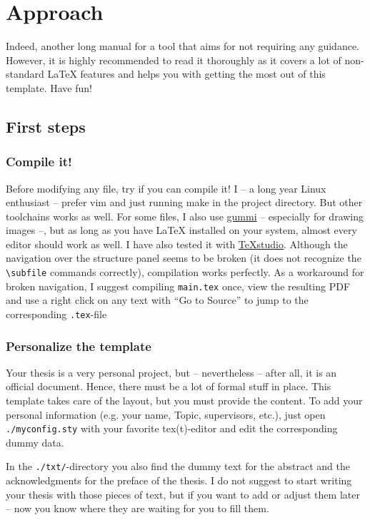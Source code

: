 \documentclass[../main.tex]{subfiles}
\begin{document}
\chapter{Approach}

Indeed, another long manual for a tool \cite{Bithappens16Template} that aims for not requiring any guidance.
However, it is highly recommended to read it thoroughly as it covers a lot of non-standard LaTeX features and helps you with getting the most out of this template.
Have fun!

\section{First steps}

\subsection{Compile it!}

Before modifying any file, try if you can compile it!
I -- a long year Linux enthusiast -- prefer vim and just running make in the project directory.
But other toolchains works as well.
For some files, I also use \href{https://github.com/alexandervdm/gummi}{gummi} -- especially for drawing images --, but as long as you have LaTeX installed on your system, almost every editor should work as well.
I have also tested it with \href{http://www.texstudio.org/}{TeXstudio}.
Although the navigation over the structure panel seems to be broken (it does not recognize the \texttt{\textbackslash subfile} commands correctly), compilation works perfectly.
As a workaround for broken navigation, I suggest compiling \texttt{main.tex} once, view the resulting PDF and use a right click on any text with \enquote{Go to Source} to jump to the corresponding \texttt{.tex}-file


\subsection{Personalize the template}

Your thesis is a very personal project, but -- nevertheless -- after all, it is an official document.
Hence, there must be a lot of formal stuff in place.
This template takes care of the layout, but you must provide the content.
To add your personal information (e.g. your name, Topic, supervisors, etc.), just open \texttt{./myconfig.sty} with your favorite tex(t)-editor and edit the corresponding dummy data.

In the \texttt{./txt/}-directory you also find the dummy text for the abstract and the acknowledgments for the preface of the thesis.
I do not suggest to start writing your thesis with those pieces of text, but if you want to add or adjust them later -- now you know where they are waiting for you to fill them.
\end{document}

